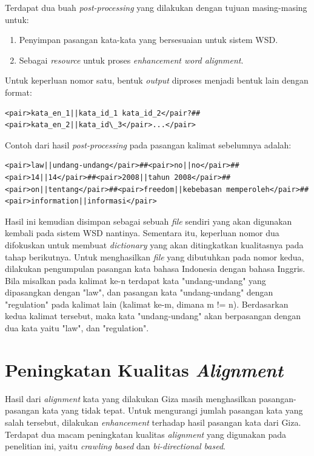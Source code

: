 Terdapat dua buah \textit{post-processing} yang dilakukan dengan tujuan masing-masing untuk:

\begin{enumerate}
	\item Penyimpan pasangan kata-kata yang bersesuaian untuk sistem WSD.
	\item Sebagai \textit{resource} untuk proses \textit{enhancement word alignment}.
\end{enumerate}


Untuk keperluan nomor satu, bentuk \textit{output} diproses menjadi bentuk lain dengan format:

\begin{lstlisting}
<pair>kata_en_1||kata_id_1 kata_id_2</pair?##<pair>kata_en_2||kata_id\_3</pair>...</pair>
\end{lstlisting}

Contoh dari hasil \textit{post-processing} pada pasangan kalimat sebelumnya adalah:

\begin{lstlisting}
<pair>law||undang-undang</pair>##<pair>no||no</pair>##<pair>14||14</pair>##<pair>2008||tahun 2008</pair>##<pair>on||tentang</pair>##<pair>freedom||kebebasan memperoleh</pair>##<pair>information||informasi</pair>
\end{lstlisting}

Hasil ini kemudian disimpan sebagai sebuah \textit{file} sendiri yang akan digunakan kembali pada sistem WSD nantinya. Sementara itu, keperluan nomor dua difokuskan untuk membuat \textit{dictionary} yang akan ditingkatkan kualitasnya pada tahap berikutnya. Untuk menghasilkan \textit{file} yang dibutuhkan pada nomor kedua, dilakukan pengumpulan pasangan kata bahasa Indonesia dengan bahasa Inggris. Bila misalkan pada kalimat ke-n terdapat kata "undang-undang" yang dipasangkan dengan "law", dan pasangan kata "undang-undang" dengan "regulation" pada kalimat lain (kalimat ke-m, dimana m != n). Berdasarkan kedua kalimat tersebut, maka kata "undang-undang" akan berpasangan dengan dua kata yaitu "law", dan "regulation".

\section{Peningkatan Kualitas \textit{Alignment}}

Hasil dari \textit{alignment} kata yang dilakukan Giza masih menghasilkan pasangan-pasangan kata yang tidak tepat. Untuk mengurangi jumlah pasangan kata yang salah tersebut, dilakukan \textit{enhancement} terhadap hasil pasangan kata dari Giza. Terdapat dua macam peningkatan kualitas \textit{alignment} yang digunakan pada penelitian ini, yaitu \textit{crawling based} dan \textit{bi-directional based}.

